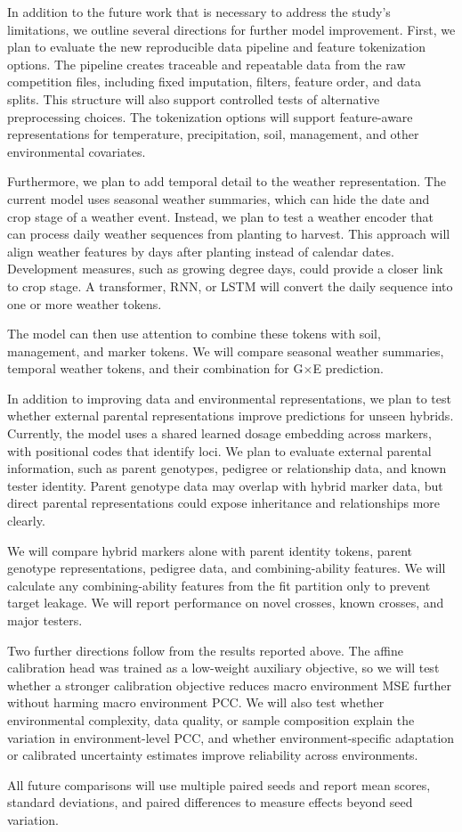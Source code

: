 In addition to the future work that is necessary to address the study's limitations, we outline several directions for further model improvement. First, we plan to evaluate the new reproducible data pipeline and feature tokenization options. The pipeline creates traceable and repeatable data from the raw competition files, including fixed imputation, filters, feature order, and data splits. This structure will also support controlled tests of alternative preprocessing choices. The tokenization options will support feature-aware representations for temperature, precipitation, soil, management, and other environmental covariates.

Furthermore, we plan to add temporal detail to the weather representation. The current model uses seasonal weather summaries, which can hide the date and crop stage of a weather event. Instead, we plan to test a weather encoder that can process daily weather sequences from planting to harvest. This approach will align weather features by days after planting instead of calendar dates. Development measures, such as growing degree days, could provide a closer link to crop stage. A transformer, RNN, or LSTM will convert the daily sequence into one or more weather tokens.

The model can then use attention to combine these tokens with soil, management, and marker tokens. We will compare seasonal weather summaries, temporal weather tokens, and their combination for G$\times$E prediction.

In addition to improving data and environmental representations, we plan to test whether external parental representations improve predictions for unseen hybrids. Currently, the model uses a shared learned dosage embedding across markers, with positional codes that identify loci. We plan to evaluate external parental information, such as parent genotypes, pedigree or relationship data, and known tester identity. Parent genotype data may overlap with hybrid marker data, but direct parental representations could expose inheritance and relationships more clearly.

We will compare hybrid markers alone with parent identity tokens, parent genotype representations, pedigree data, and combining-ability features. We will calculate any combining-ability features from the fit partition only to prevent target leakage. We will report performance on novel crosses, known crosses, and major testers.

Two further directions follow from the results reported above. The affine calibration head was trained as a low-weight auxiliary objective, so we will test whether a stronger calibration objective reduces macro environment MSE further without harming macro environment PCC. We will also test whether environmental complexity, data quality, or sample composition explain the variation in environment-level PCC, and whether environment-specific adaptation or calibrated uncertainty estimates improve reliability across environments.

All future comparisons will use multiple paired seeds and report mean scores, standard deviations, and paired differences to measure effects beyond seed variation.
